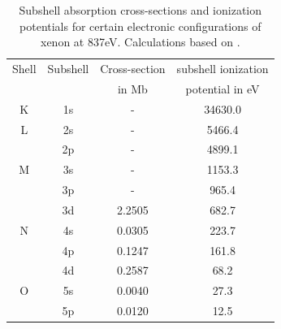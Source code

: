 \begin{table}
	\centering
		\begin{tabular}{ | c | c | c | c | }
			\hline
			Shell & Subshell & Cross-section & subshell ionization \\
				&	& in Mb & potential in eV \\ \hline
			K & 1s & - & 34630.0 \\ \hline
			L & 2s & - & 5466.4  \\ 
			\ & 2p & - & 4899.1 \\ \hline
			M & 3s & - & 1153.3  \\ 
			\ & 3p & - & 965.4 \\ 
			\ & 3d & 2.2505 & 682.7 \\ \hline
			N & 4s & 0.0305 & 223.7 \\ 
			\ & 4p & 0.1247 & 161.8 \\ 
			\ & 4d & 0.2587 & 68.2  \\ \hline
			O & 5s & 0.0040 & 27.3  \\ 
			\ & 5p & 0.0120 & 12.5  \\ \hline
		\end{tabular}
	\caption[Subshell absorption cross-sections and ionization potentials for xenon.]{Subshell absorption cross-sections and ionization potentials for certain electronic configurations of xenon at 837eV. Calculations based on \citep{Cowan-1981-Cal}.}
	\label{tab:xenon-photoionization-cross-section}
\end{table}
